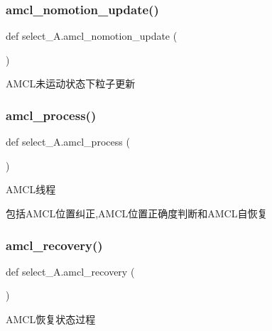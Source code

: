 \subsubsection{\texorpdfstring{amcl\+\_\+nomotion\+\_\+update()}{amcl\_nomotion\_update()}}
{\footnotesize\ttfamily def select\+\_\+\+A.\+amcl\+\_\+nomotion\+\_\+update (\begin{DoxyParamCaption}{ }\end{DoxyParamCaption})}



A\+M\+C\+L未运动状态下粒子更新 

\mbox{\label{namespaceselect___a_a97410aa944db08a7803c0395c7c1171c}} 
\subsubsection{\texorpdfstring{amcl\+\_\+process()}{amcl\_process()}}
{\footnotesize\ttfamily def select\+\_\+\+A.\+amcl\+\_\+process (\begin{DoxyParamCaption}{ }\end{DoxyParamCaption})}



A\+M\+C\+L线程 

包括\+A\+M\+C\+L位置纠正,A\+M\+C\+L位置正确度判断和\+A\+M\+C\+L自恢复 \mbox{\label{namespaceselect___a_a45210262734cf777b4d1df68bce66838}} 
\subsubsection{\texorpdfstring{amcl\+\_\+recovery()}{amcl\_recovery()}}
{\footnotesize\ttfamily def select\+\_\+\+A.\+amcl\+\_\+recovery (\begin{DoxyParamCaption}{ }\end{DoxyParamCaption})}



A\+M\+C\+L恢复状态过程 

\mbox{\label{namespaceselect___a_a5989337483bc940c36178192ccc31e24}} 
